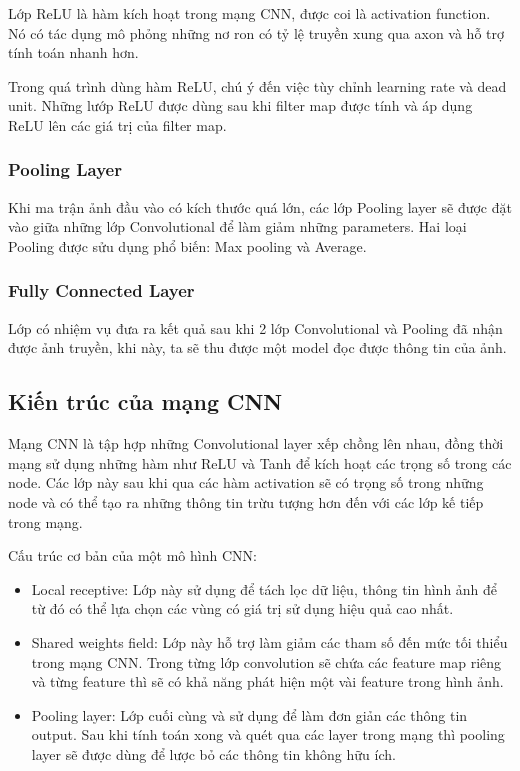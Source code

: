 Lớp ReLU là hàm kích hoạt trong mạng CNN, được coi là activation function. Nó có tác dụng mô phỏng những nơ ron có tỷ lệ truyền xung qua axon và hỗ trợ tính toán nhanh hơn.

Trong quá trình dùng hàm ReLU, chú ý đến việc tùy chỉnh learning rate và dead unit. Những lướp ReLU được dùng sau khi filter map được tính và áp dụng ReLU lên các giá trị của filter map.

\subsubsection{Pooling Layer}

Khi ma trận ảnh đầu vào có kích thước quá lớn, các lớp Pooling layer sẽ được đặt vào giữa những lớp Convolutional để làm giảm những parameters. Hai loại Pooling được sửu dụng phổ biến: Max pooling và Average.

\subsubsection{Fully Connected Layer}

Lớp có nhiệm vụ đưa ra kết quả sau khi 2 lớp Convolutional và Pooling đã nhận được ảnh truyền, khi này, ta sẽ thu được một model đọc được thông tin của ảnh.

\subsection{Kiến trúc của mạng CNN}

Mạng CNN là tập hợp những Convolutional layer xếp chồng lên nhau, đồng thời mạng sử dụng những hàm như ReLU và Tanh để kích hoạt các trọng số trong các node. Các lớp này sau khi qua các hàm activation sẽ có trọng số trong những node và có thể tạo ra những thông tin trừu tượng hơn đến với các lớp kế tiếp trong mạng.  

Cấu trúc cơ bản của một mô hình CNN:

\begin{itemize}
	\item Local receptive: Lớp này sử dụng để tách lọc dữ liệu, thông tin hình ảnh để từ đó có thể lựa chọn các vùng có giá trị sử dụng hiệu quả cao nhất.
	
	\item Shared weights field: Lớp này hỗ trợ làm giảm các tham số đến mức tối thiểu trong mạng CNN. Trong từng lớp convolution sẽ chứa các feature map riêng và từng feature thì sẽ có khả năng phát hiện một vài feature trong hình ảnh.
	
	\item Pooling layer: Lớp cuối cùng và sử dụng để làm đơn giản các thông tin output. Sau khi tính toán xong và quét qua các layer trong mạng thì pooling layer sẽ được dùng để lược bỏ các thông tin không hữu ích.
\end{itemize}

